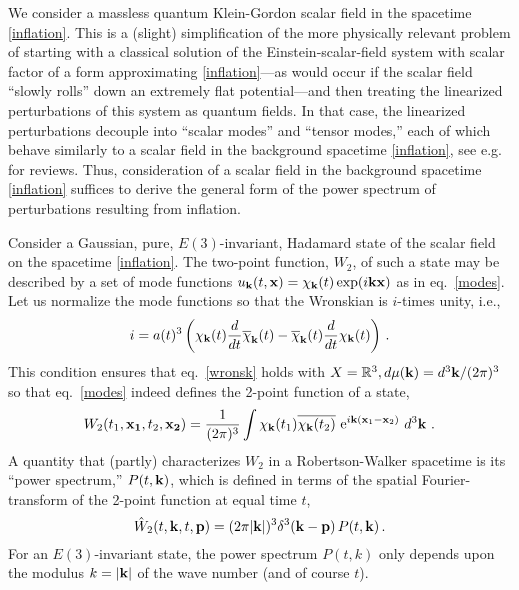 \documentclass[12pt]{article}
\newcommand{\RR}{\mathbb{R}}
\newcommand{\e}{{\rm e}}
\renewcommand{\k}{{\bf k}}
\theoremstyle{plain}
\theoremstyle{definition}
\def\ben{\begin{equation}}
\def\een{\end{equation}}
\begin{document}
We consider a massless quantum Klein-Gordon scalar field in the spacetime \eqref{inflation}. This is a (slight)
simplification of the more physically relevant problem of
starting with a classical solution of the Einstein-scalar-field system with scalar factor
of a form approximating \eqref{inflation}---as would occur if the scalar field ``slowly rolls'' down an
extremely flat potential---and then treating the linearized perturbations of this system
as quantum fields. In that case, the linearized perturbations decouple into ``scalar modes'' and
``tensor modes,'' each of which behave similarly to a scalar field in the background spacetime \eqref{inflation}, see e.g.~\cite{sasaki,mukh} for 
reviews.
Thus, consideration of a scalar field in the background spacetime \eqref{inflation} suffices to derive
the general form of the power spectrum of perturbations resulting from inflation.

Consider a Gaussian, pure, $E(3)$-invariant, Hadamard state of the scalar field on the
spacetime \eqref{inflation}.  The two-point function, $W_2$, of such a state may be described
by a set of mode functions $u_{\bf k} (t, {\bf x}) = \chi_{\bf k}(t) \exp(i{\bf kx})$ as
in eq.~\eqref{modes}.
Let us normalize
the mode functions so that the Wronskian is $i$-times unity, i.e.,
\ben
i = a(t)^{3} \left(
\chi_{\bf k}(t) \frac{d}{dt} \overline\chi_{\bf k}(t) -
\overline \chi_{\bf k}(t) \frac{d}{dt} \chi_{\bf k}(t)
\right) \, .
\een
This condition ensures that eq.~\eqref{wronsk} holds with $X = \RR^3, d\mu(\k) = d^3 \k/(2\pi)^3$
so that eq.~\eqref{modes} indeed defines the 2-point function of a state,
\ben
W_2(t_1, {\bf x_1}, t_2, {\bf x_2}) =
\frac{1}{(2\pi)^3} \int \chi_{\bf k}(t_1) \overline{\chi_{\bf k}(t_2)} \ \e^{i{\bf k}({\bf x}_1-{\bf x}_2)} \ d^3 {\bf k} \ .
\label{inflation2}
\een
A quantity that (partly) characterizes $W_2$
in a Robertson-Walker spacetime is its
``power spectrum,'' $P(t,{\bf k})$, which is defined in terms of the spatial Fourier-transform of the 2-point function at equal time $t$,
\ben
\hat W_2(t, {\bf k}, t, {\bf p}) = (2\pi|{\bf k}|)^3 \delta^3({\bf k}-{\bf p}) \, P(t,{\bf k}) \, .
\een
For an $E(3)$-invariant state, the power spectrum
$P(t,k)$ only depends upon the modulus $k=|{\bf k}|$ of the
wave number (and of course $t$).
\end{document}
